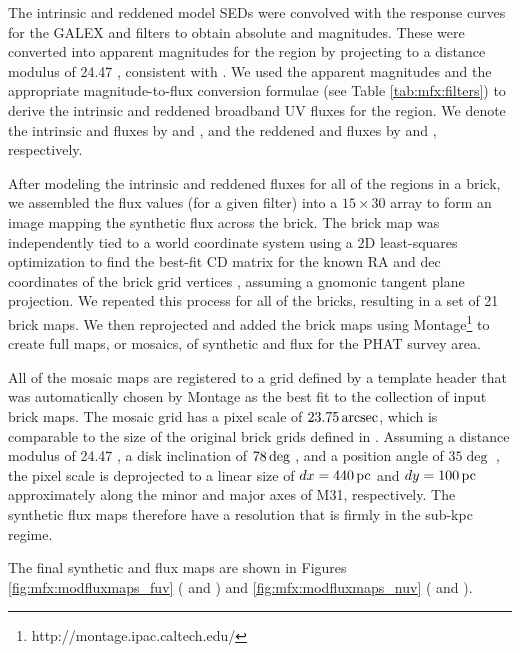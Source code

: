The intrinsic and reddened model SEDs were convolved with the response curves
for the GALEX \fuv{} and \nuv{} filters to obtain absolute \fuv{} and \nuv{}
magnitudes. These were converted into apparent magnitudes for the region by
projecting to a distance modulus of 24.47 \citep{McConnachie:2005}, consistent
with \citet{Lewis:2014}. We used the apparent magnitudes and the appropriate
magnitude-to-flux conversion formulae (see Table \ref{tab:mfx:filters}) to
derive the intrinsic and reddened broadband UV fluxes for the region. We denote
the intrinsic \fuv{} and \nuv{} fluxes by \ffuvsfhz{} and \fnuvsfhz{}, and the
reddened \fuv{} and \nuv{} fluxes by \ffuvsfh{} and \fnuvsfh{}, respectively.





After modeling the intrinsic and reddened fluxes for all of the regions in a
brick, we assembled the flux values (for a given filter) into a $15 \times 30$
array to form an image mapping the synthetic flux across the brick. The brick
map was independently tied to a world coordinate system using a 2D
least-squares optimization to find the best-fit CD matrix
\citep{Calabretta:2002} for the known RA and dec coordinates of the brick grid
vertices \citep[measured by][]{Lewis:2014}, assuming a gnomonic tangent plane
projection. We repeated this process for all of the \citet{Lewis:2014} bricks,
resulting in a set of 21 brick maps. We then reprojected and added the brick
maps using Montage\footnote{http://montage.ipac.caltech.edu/} to create full
maps, or mosaics, of synthetic \fuv{} and \nuv{} flux for the PHAT survey area.

All of the mosaic maps are registered to a grid defined by a template header
that was automatically chosen by Montage as the best fit to the collection of
input brick maps. The mosaic grid has a pixel scale of $23.75\,\mathrm{arcsec}$, which
is comparable to the size of the original brick grids defined in
\citet{Lewis:2014}. Assuming a distance modulus of 24.47
\citep{McConnachie:2005}, a disk inclination of $78\,\mathrm{deg}$ \citep{Tully:1994},
and a position angle of $35\deg$ \citep{deVaucouleurs:1995}, the pixel scale is
deprojected to a linear size of $dx = 440\,\mathrm{pc}$ and $dy = 100\,\mathrm{pc}$ approximately
along the minor and major axes of M31, respectively. The synthetic flux maps
therefore have a resolution that is firmly in the sub-kpc regime.

The final synthetic \fuv{} and \nuv{} flux maps are shown in Figures
\ref{fig:mfx:modfluxmaps_fuv} (\ffuvsfhz{} and \ffuvsfh{}) and
\ref{fig:mfx:modfluxmaps_nuv} (\fnuvsfhz{} and \fnuvsfh{}).

